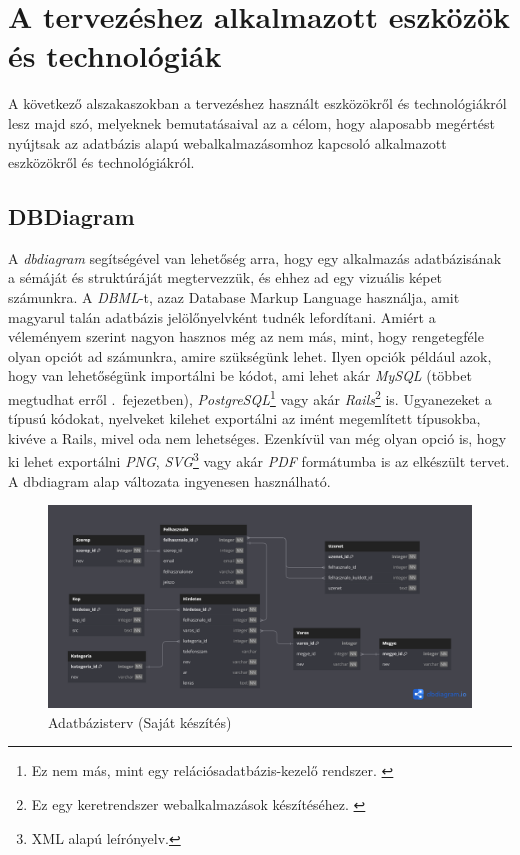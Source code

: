 \documentclass[]{thesis-ekf}
\theoremstyle{definition}
\theoremstyle{remark}
\begin{document}
	\section{A tervezéshez alkalmazott eszközök és technológiák}
		A következő alszakaszokban a tervezéshez használt eszközökről és technológiákról lesz majd szó, melyeknek bemutatásaival az a célom, hogy alaposabb megértést nyújtsak az adatbázis alapú webalkalmazásomhoz kapcsoló alkalmazott eszközökről és technológiákról.
	\subsection{DBDiagram}
	A \emph{dbdiagram} segítségével van lehetőség arra, hogy egy alkalmazás adatbázisának a sémáját és struktúráját megtervezzük, és ehhez ad egy vizuális képet számunkra. A \emph{DBML}-t, azaz Database Markup Language használja, amit magyarul talán adatbázis jelölőnyelvként tudnék lefordítani. Amiért a véleményem szerint nagyon hasznos még az nem más, mint, hogy rengetegféle olyan opciót ad számunkra, amire szükségünk lehet. Ilyen opciók például azok, hogy van lehetőségünk importálni be kódot, ami lehet akár \emph{MySQL} (többet megtudhat erről .~fejezetben), \emph{PostgreSQL}\footnote{Ez nem más, mint egy relációsadatbázis-kezelő rendszer. \cite{PostgreSQL}} vagy akár \emph{Rails}\footnote{Ez egy keretrendszer webalkalmazások készítéséhez. \cite{Rails}} is. Ugyanezeket a típusú kódokat, nyelveket kilehet exportálni az imént megemlített típusokba, kivéve a Rails, mivel oda nem lehetséges. Ezenkívül van még olyan opció is, hogy ki lehet exportálni \emph{PNG}, \emph{SVG}\footnote{XML alapú leírónyelv.} vagy akár \emph{PDF} formátumba is az elkészült tervet. A dbdiagram alap változata ingyenesen használható. \cite{Dbdiagram}
	
	\begin{figure}[ht!]
		\centering
		\includegraphics[width=15cm]{./tervezes/dbdiagram}
		\caption{Adatbázisterv (Saját készítés)} 
		\label{dbdiagram}
	\end{figure}
	
\end{document}

